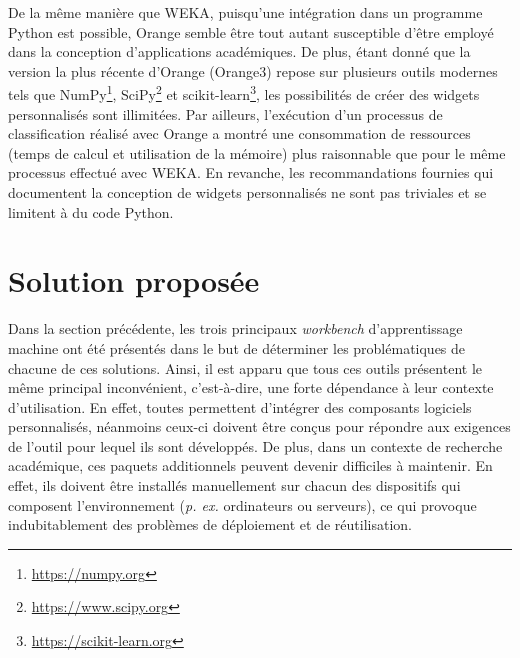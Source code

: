 De la même manière que WEKA, puisqu'une intégration dans un programme Python est possible, Orange semble être tout autant susceptible d'être employé dans la conception d'applications académiques. De plus, étant donné que la version la plus récente d'Orange (Orange3) repose sur plusieurs outils modernes tels que NumPy\footnote{\url{https://numpy.org}}, SciPy\footnote{\url{https://www.scipy.org}} et scikit-learn\footnote{\url{https://scikit-learn.org}}, les possibilités de créer des widgets personnalisés sont illimitées. Par ailleurs, l'exécution d'un processus de classification réalisé avec Orange a montré une consommation de ressources (temps de calcul et utilisation de la mémoire) plus raisonnable que pour le même processus effectué avec \acs{WEKA}. En revanche, les recommandations fournies qui documentent la conception de widgets personnalisés ne sont pas triviales et se limitent à du code Python.

\section{Solution proposée}

Dans la section précédente, les trois principaux \textit{workbench} d'apprentissage machine ont été présentés dans le but de déterminer les problématiques de chacune de ces solutions. Ainsi, il est apparu que tous ces outils présentent le même principal inconvénient, c'est-à-dire, une forte dépendance à leur contexte d'utilisation. En effet, toutes permettent d'intégrer des composants logiciels personnalisés, néanmoins ceux-ci doivent être conçus pour répondre aux exigences de l'outil pour lequel ils sont développés. De plus, dans un contexte de recherche académique, ces paquets additionnels peuvent devenir difficiles à maintenir. En effet, ils doivent être installés manuellement sur chacun des dispositifs qui composent l'environnement (\textit{p. ex.} ordinateurs ou serveurs), ce qui provoque indubitablement des problèmes de déploiement et de réutilisation.

